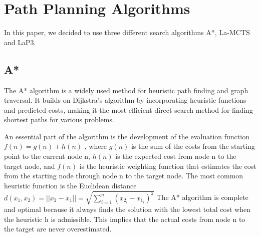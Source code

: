 \documentclass[bibliography=totoc]{scrartcl}
\begin{document}
\section{Path Planning Algorithms}
\label{path_planning_algorithm}
In this paper, we decided to use three different search algorithms A*, \ac{La-MCTS} and \ac{LaP3}.

\subsection{A*}

The A* algorithm is a widely used method for heuristic path finding and graph traversal. \cite{4082128} \cite{ProbabilisticApproachCollaborativeMultiRobotLocalization}
It builds on Dijkstra's algorithm by incorporating heuristic functions and predicted costs, making it the most efficient direct search method for finding shortest paths for various problems.\cite{ProbabilisticApproachCollaborativeMultiRobotLocalization}

An essential part of the algorithm is the development of the evaluation function $f(n) = g(n) + h(n)$ \cite[p. 121]{GrundkursKuenstlicheIntelligenz}, where $g(n)$ is the sum of the costs from the starting point to the current node n, $h(n)$ is the expected cost from node n to the target node, and $f(n)$ is the heuristic weighting function that estimates the cost from the starting node through node n to the target node.
The most common heuristic function is the Euclidean distance $d \left( x_1,x_2\right) = ||x_2- x_1|| =\sqrt {\sum _{i=1}^{n} \left( x_{2_i}-x_{1_i}\right)^2 } $
The A* algorithm is complete and optimal because it always finds the solution with the lowest total cost when the heuristic h is admissible.\cite[p. 121]{GrundkursKuenstlicheIntelligenz}
This implies that the actual costs from node n to the target are never overestimated.
\end{document}
